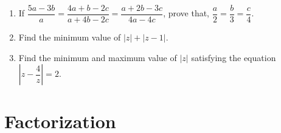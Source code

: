\documentclass[11pt, a4paper]{article}
\begin{document}
\begin{enumerate}
	\item If $\dfrac{5a-3b}{a} = \dfrac{4a+b-2c}{a+4b-2c} = \dfrac{a+2b-3c}{4a-4c}$, prove that, $\dfrac{a}{2} = \dfrac{b}{3} = \dfrac{c}{4}$.
	
	\item Find the minimum value of $|z| + |z-1|$.
	
	\item Find the minimum and maximum value of $|z|$ satisfying the equation $\left| z - \dfrac{4}{z} \right|= 2$.
\end{enumerate}





\section{Factorization}
\end{document}
